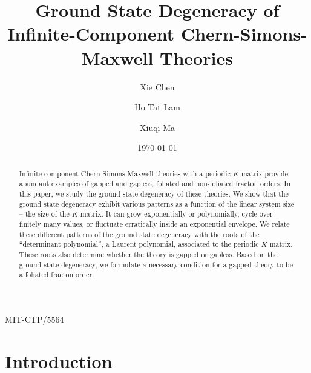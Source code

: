 \documentclass[aps,prb,twocolumn,superscriptaddress,floatfix,10pt,nofootinbib]{revtex4-2}
\theoremstyle{definition}
\begin{document}
\hfill MIT-CTP/5564

\title{Ground State Degeneracy of Infinite-Component Chern-Simons-Maxwell Theories}
\date{\today}


\author{Xie Chen}

\author{Ho Tat Lam}

\author{Xiuqi Ma}

\begin{abstract} 
Infinite-component Chern-Simons-Maxwell theories with a periodic $K$ matrix provide abundant examples of gapped and gapless, foliated and non-foliated fracton orders. In this paper, we study the ground state degeneracy of these theories. We show that the ground state degeneracy exhibit various patterns as a function of the linear system size -- the size of the $K$ matrix. It can grow exponentially or polynomially, cycle over finitely many values, or fluctuate erratically inside an exponential envelope. We relate these different patterns of the ground state degeneracy with the roots of the ``determinant polynomial'', a Laurent polynomial, associated to the periodic $K$ matrix. These roots also determine whether the theory is gapped or gapless. Based on the ground state degeneracy, we formulate a necessary condition for a gapped theory to be a foliated fracton order. 
\end{abstract}

\maketitle

\tableofcontents


\section{Introduction}
\end{document}
